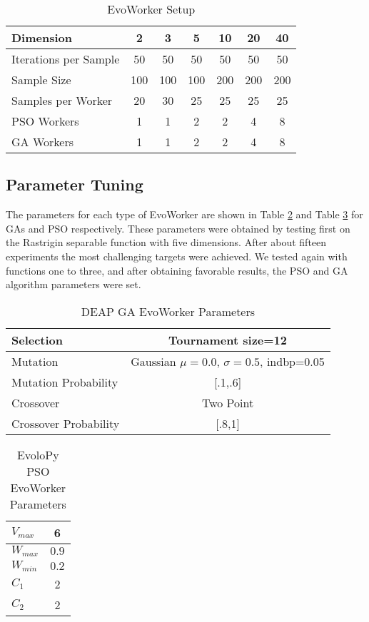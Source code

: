 \documentclass[sigconf]{acmart}
\begin{document}
\begin{table}
  \small
  \caption{EvoWorker Setup}
  \label{tab:params} 
  \centering
  \small
  \begin{tabular}{|l|c|c|c|c|c|c|}
    \hline
    Dimension & 2 & 3 & 5 & 10 & 20 & 40\\ \hline
    Iterations per Sample  & 50 & 50 & 50 & 50 & 50 & 50\\ \hline
    Sample Size  & 100 & 100 & 100 & 200 & 200 & 200 \\ \hline
    Samples per Worker & 20 & 30 & 25 & 25 & 25 & 25  \\ \hline
    PSO Workers & 1 & 1 & 2 & 2 & 4 & 8  \\ \hline
    GA Workers & 1 & 1 & 2 & 2 & 4 & 8  \\ \hline
  \end{tabular}
\end{table}


\subsection{Parameter Tuning}

The parameters for each type of EvoWorker are shown in Table \ref{tab:GAparams}
and Table \ref{tab:PSOparams} for GAs and PSO respectively. These parameters 
were obtained by testing first on the Rastrigin separable function with 
five dimensions.  After about fifteen experiments the most challenging 
targets were achieved. We tested again with functions one to three, and 
after obtaining favorable results, the PSO and GA algorithm parameters were set.  

\begin{table}
  \small
  \caption{ DEAP GA EvoWorker Parameters }
  \label{tab:GAparams} 
  \centering
  \small
  \begin{tabular}{|l|c|}
    \hline
    Selection & Tournament size=12\\ \hline
    Mutation & Gaussian $\mu=0.0$, $\sigma=0.5$, indbp=0.05  \\ \hline
    Mutation Probability & [.1,.6]  \\ \hline
    Crossover & Two Point  \\ \hline
    Crossover Probability& [.8,1]  \\ \hline
  \end{tabular}
\end{table}

\begin{table}
  \small
  \caption{ EvoloPy PSO EvoWorker Parameters }
  \label{tab:PSOparams} 
  \centering
  \small
  \begin{tabular}{|l|c|}
    \hline
    $V_{max}$ & 6 \\ \hline
    $W_{max}$ & $0.9$ \\ \hline
    $W_{min}$ & $0.2$ \\ \hline
    $C_1$ & 2 \\ \hline
    $C_2$ & 2 \\ \hline
  \end{tabular}
\end{table}
\end{document}
